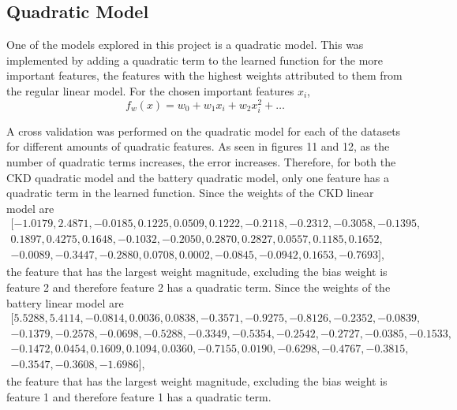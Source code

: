 \documentclass{article}
\begin{document}
\subsection{Quadratic Model}

One of the models explored in this project is a quadratic model.  This was implemented by adding a quadratic term to the learned function for the more important features, the features with the highest weights attributed to them from the regular linear model.  For the chosen important features $x_i$, 
\begin{equation}
   f_w(x) = w_0 + w_1 x_i + w_2 x_i^2 + \dots
\end{equation}

A cross validation was performed on the quadratic model for each of the datasets for different amounts of quadratic features.  As seen in figures 11 and 12, 
as the number of quadratic terms increases, the error increases.  Therefore, for both the CKD quadratic model and the battery quadratic model, only one feature has a quadratic term in the learned function.   
Since the weights of the CKD linear model are 
\begin{equation*}
  \begin{aligned}
    [-1.0179,  2.4871, -0.0185,  0.1225, 0.0509,  0.1222, -0.2118, -0.2312, -0.3058, -0.1395, \\
    0.1897,  0.4275,  0.1648, -0.1032, -0.2050,  0.2870,  0.2827,  0.0557, 0.1185,  0.1652, \\
    -0.0089, -0.3447, -0.2880,  0.0708, 0.0002, -0.0845, -0.0942,  0.1653, -0.7693],
  \end{aligned}
\end{equation*}
the feature that has the largest weight magnitude, excluding  the bias weight is feature 2 and therefore feature 2 has a quadratic term.   
Since the weights of the battery linear model are 
\begin{equation*}
  \begin{aligned}
    [5.5288, 5.4114, -0.0814, 0.0036, 0.0838, -0.3571, -0.9275, -0.8126, -0.2352, -0.0839, \\
    -0.1379, -0.2578, -0.0698, -0.5288, -0.3349, -0.5354, -0.2542, -0.2727, -0.0385, -0.1533, \\
    -0.1472, 0.0454, 0.1609, 0.1094, 0.0360, -0.7155, 0.0190, -0.6298, -0.4767, -0.3815, \\
    -0.3547, -0.3608, -1.6986],
  \end{aligned}
  \end{equation*}
the feature that has the largest weight magnitude, excluding the bias weight is feature 1 and therefore feature 1 has a quadratic term. 
\end{document}
